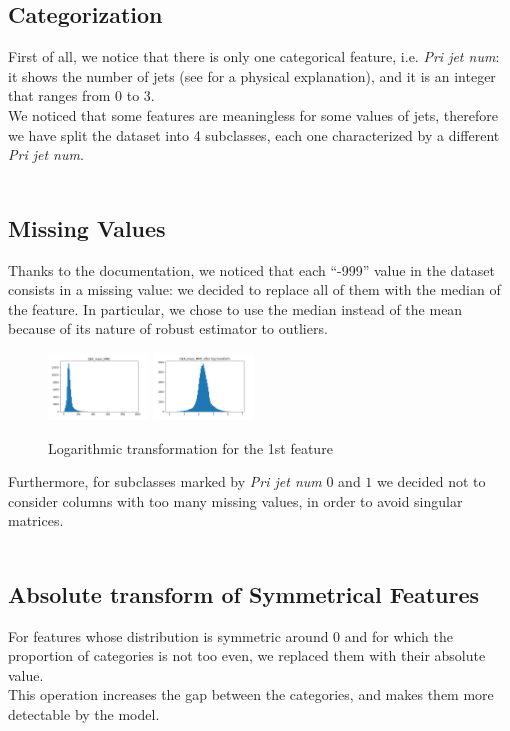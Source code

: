 \documentclass[10pt,conference,compsocconf]{IEEEtran}
\begin{document}
\subsection{Categorization}
First of all, we notice that there is only one categorical feature, i.e. \textit{Pri jet num}: it shows the number of jets (see \cite{higgs} for a physical explanation), and it is an integer that ranges from 0 to 3. \\
We noticed that some features are meaningless for some values of jets, therefore we have split the dataset into 4 subclasses, each one characterized by a different \textit{Pri jet num}.\\
\vspace{-0.8cm}\\

\subsection{Missing Values}
Thanks to the documentation, we noticed that each “-999” value
in the dataset consists in a missing value: we decided to replace all of them with the median of the feature. In particular, we chose to use the median instead of the mean because of its nature of robust estimator to outliers.\\
\begin{figure}[h]
    \centering
    \includegraphics[width=0.237\textwidth]{report/HeavyTail_before_log.png}
    \includegraphics[width=0.237\textwidth]{report/HeavyTail_after_log.png}
    \caption{Logarithmic transformation for the 1st feature}
    \label{fig:lambdas}
\end{figure}
Furthermore, for subclasses marked by \textit{Pri jet num} $0$ and $1$ we decided not to consider columns with too many missing values, in order to avoid singular matrices.\\
\vspace{-0.8cm}\\

\subsection{Absolute transform of Symmetrical Features}
For features whose distribution is symmetric around 0 and for which the proportion of categories is not too even, we replaced them with their absolute value.\\
This operation increases the gap between the categories, and makes them more detectable by the model. \\
\vspace{-0.8cm}\\
\end{document}
